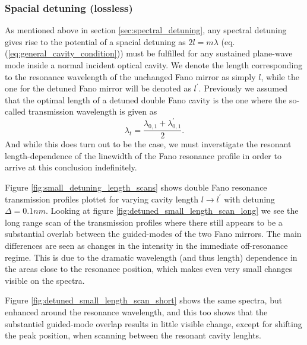 \subsubsection{Spacial detuning (lossless)} \label{sec:spacial_detuning}

As mentioned above in section \ref{sec:spectral_detuning}, any spectral detuning gives rise to the potential of a spacial detuning as $2l = m\lambda$ (eq. (\ref{eq:general_cavity_condition})) must be fulfilled for any sustained plane-wave mode inside a normal incident optical cavity. We denote the length corresponding to the resonance wavelength of the unchanged Fano mirror as simply $l$, while the one for the detuned Fano mirror will be denoted as $l^{\prime}$. Previously we assumed that the optimal length of a detuned double Fano cavity is the one where the so-called transmission wavelength is given as 
\begin{equation}
    \lambda_t = \frac{\lambda_{0,1} + \lambda_{0,1}^{\prime}}{2}.
\end{equation}
And while this does turn out to be the case, we must inverstigate the resonant length-dependence of the linewidth of the Fano resonance profile in order to arrive at this conclusion indefinitely. 

Figure \ref{fig:small_detuning_length_scans} shows double Fano resonance transmission profiles plottet for varying cavity length $l \rightarrow l^{\prime}$ with detuning $\Delta = 0.1nm$. Looking at figure \ref{fig:detuned_small_length_scan_long} we see the long range scan of the transmission profiles where there still appears to be a substantial overlab between the guided-modes of the two Fano mirrors. The main differences are seen as changes in the intensity in the immediate off-resonance regime. This is due to the dramatic wavelength (and thus length) dependence in the areas close to the resonance position, which makes even very small changes visible on the spectra.

Figure \ref{fig:detuned_small_length_scan_short} shows the same spectra, but enhanced around the resonance wavelength, and this too shows that the substantiel guided-mode overlap results in little visible change, except for shifting the peak position, when scanning between the resonant cavity lenghts. 

